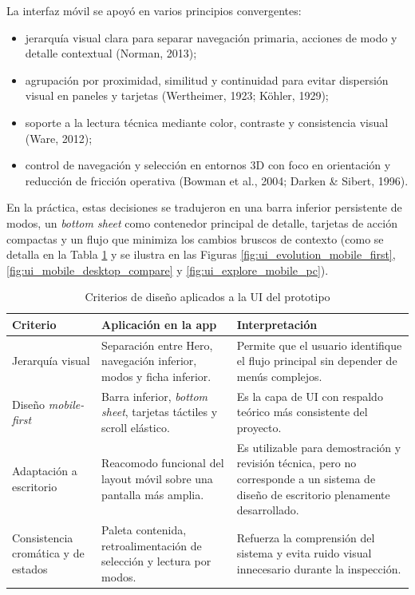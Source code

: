 La interfaz móvil se apoyó en varios principios convergentes:
\begin{itemize}
    \item jerarquía visual clara para separar navegación primaria, acciones de modo y detalle contextual (Norman, 2013);
    \item agrupación por proximidad, similitud y continuidad para evitar dispersión visual en paneles y tarjetas (Wertheimer, 1923; Köhler, 1929);
    \item soporte a la lectura técnica mediante color, contraste y consistencia visual (Ware, 2012);
    \item control de navegación y selección en entornos 3D con foco en orientación y reducción de fricción operativa (Bowman et al., 2004; Darken \& Sibert, 1996).
\end{itemize}

En la práctica, estas decisiones se tradujeron en una barra inferior persistente de modos, un \textit{bottom sheet} como contenedor principal de detalle, tarjetas de acción compactas y un flujo que minimiza los cambios bruscos de contexto (como se detalla en la Tabla \ref{tab:criterios_uix_mobile_first} y se ilustra en las Figuras \ref{fig:ui_evolution_mobile_first}, \ref{fig:ui_mobile_desktop_compare} y \ref{fig:ui_explore_mobile_pc}).

\begin{table}[H]
    \caption{Criterios de diseño aplicados a la UI del prototipo}
    \label{tab:criterios_uix_mobile_first}
    \centering
    \small
    \begin{tabular}{p{3.2cm}p{4.8cm}p{6.0cm}}
        \hline
        \textbf{Criterio} & \textbf{Aplicación en la app} & \textbf{Interpretación} \\ \hline
        Jerarquía visual & Separación entre Hero, navegación inferior, modos y ficha inferior. & Permite que el usuario identifique el flujo principal sin depender de menús complejos. \\
        Diseño \textit{mobile-first} & Barra inferior, \textit{bottom sheet}, tarjetas táctiles y scroll elástico. & Es la capa de UI con respaldo teórico más consistente del proyecto. \\
        Adaptación a escritorio & Reacomodo funcional del layout móvil sobre una pantalla más amplia. & Es utilizable para demostración y revisión técnica, pero no corresponde a un sistema de diseño de escritorio plenamente desarrollado. \\
        Consistencia cromática y de estados & Paleta contenida, retroalimentación de selección y lectura por modos. & Refuerza la comprensión del sistema y evita ruido visual innecesario durante la inspección. \\ \hline
    \end{tabular}
    \par\vspace{0.5\baselineskip}
\end{table}

